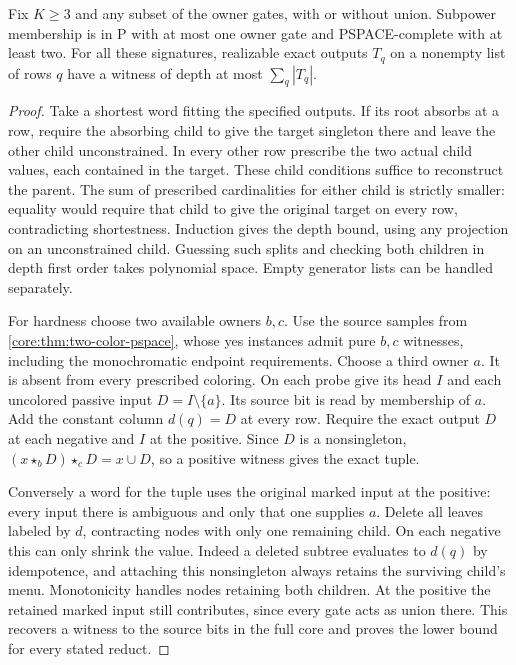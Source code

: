 \begin{theorem}
\label{core:thm:subpower-complexity}
Fix $K\ge3$ and any subset of the owner gates, with or without union.
Subpower membership is in $\mathrm P$ with at most one owner gate
and PSPACE-complete with at least two. For all these signatures,
realizable exact outputs $T_q$ on a nonempty list of rows $q$ have a
witness of depth at most $\sum_q|T_q|$.
\end{theorem}
\begin{proof}
Take a shortest word fitting the specified outputs. If its root
absorbs at a row, require the absorbing child to give the target
singleton there and leave the other child unconstrained. In every
other row prescribe the two actual child values, each contained in
the target. These child conditions suffice to reconstruct the parent.
The sum of prescribed cardinalities for either child is strictly
smaller: equality would require that child to give the original target
on every row, contradicting shortestness. Induction gives the depth
bound, using any projection on an unconstrained child. Guessing such
splits and checking both children in depth first order takes polynomial
space. Empty generator lists can be handled separately.

For hardness choose two available owners $b,c$. Use the source samples
from \cref{core:thm:two-color-pspace}, whose yes instances admit pure
$b,c$ witnesses, including the monochromatic endpoint requirements.
Choose a third owner $a$. It is absent from every prescribed coloring.
On each probe give its head $I$ and each uncolored passive input
$D=I\setminus\{a\}$. Its source bit is read by membership of $a$.
Add the constant column $d(q)=D$ at every row. Require the exact
output $D$ at each negative and $I$ at the positive. Since $D$ is
a nonsingleton,
$(x\star_bD)\star_cD=x\cup D$, so a positive witness gives the exact tuple.

Conversely a word for the tuple uses the original marked input at the
positive: every input there is ambiguous and only that one supplies
$a$. Delete all leaves labeled by $d$, contracting nodes with only
one remaining child. On each negative this can only shrink the value.
Indeed a deleted subtree evaluates to $d(q)$ by idempotence, and
attaching this nonsingleton always retains the surviving child's
menu. Monotonicity handles nodes retaining both children. At the
positive the retained marked input still contributes, since every
gate acts as union there. This recovers a witness to the source bits
in the full core and proves the lower bound for every stated reduct.


\end{proof}

